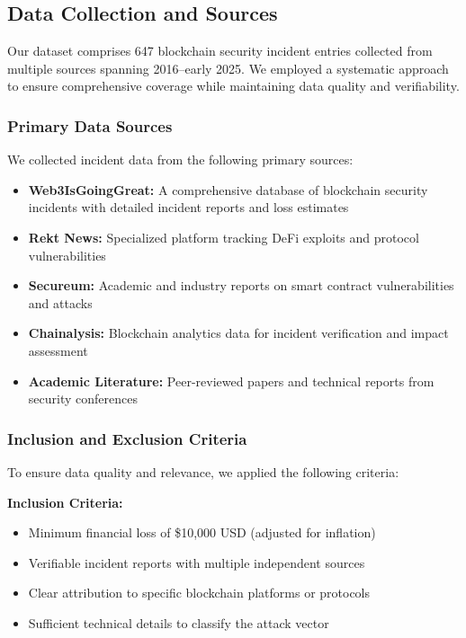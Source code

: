 \subsection{Data Collection and Sources}
\label{sec:data_collection}

Our dataset comprises 647 blockchain security incident entries collected from multiple sources spanning 2016--early 2025. We employed a systematic approach to ensure comprehensive coverage while maintaining data quality and verifiability.

\subsubsection{Primary Data Sources}
We collected incident data from the following primary sources:
\begin{itemize}
    \item \textbf{Web3IsGoingGreat:} A comprehensive database of blockchain security incidents with detailed incident reports and loss estimates
    \item \textbf{Rekt News:} Specialized platform tracking DeFi exploits and protocol vulnerabilities
    \item \textbf{Secureum:} Academic and industry reports on smart contract vulnerabilities and attacks
    \item \textbf{Chainalysis:} Blockchain analytics data for incident verification and impact assessment
    \item \textbf{Academic Literature:} Peer-reviewed papers and technical reports from security conferences
\end{itemize}

\subsubsection{Inclusion and Exclusion Criteria}
To ensure data quality and relevance, we applied the following criteria:

\textbf{Inclusion Criteria:}
\begin{itemize}
    \item Minimum financial loss of \$10,000 USD (adjusted for inflation)
    \item Verifiable incident reports with multiple independent sources
    \item Clear attribution to specific blockchain platforms or protocols
    \item Sufficient technical details to classify the attack vector
\end{itemize}

